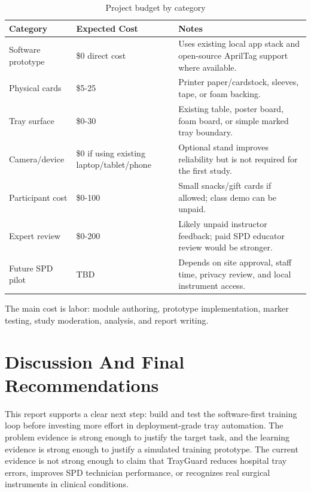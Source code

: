 \documentclass[10pt,a4paper]{article}
\begin{document}
\begin{table}[H]
\centering
\caption{Project budget by category}
\label{tab:project-budget-by-category}
\small\renewcommand{\arraystretch}{1.2}\setlength{\tabcolsep}{4pt}
\begin{tabularx}{\textwidth}{|>{\raggedright\arraybackslash}X|>{\raggedright\arraybackslash}X|>{\raggedright\arraybackslash}X|}
\hline
Category & Expected Cost & Notes \\
\hline
Software prototype & \$0 direct cost & Uses existing local app stack and open-source AprilTag support where available. \\
\hline
Physical cards & \$5-25 & Printer paper/cardstock, sleeves, tape, or foam backing. \\
\hline
Tray surface & \$0-30 & Existing table, poster board, foam board, or simple marked tray boundary. \\
\hline
Camera/device & \$0 if using existing laptop/tablet/phone & Optional stand improves reliability but is not required for the first study. \\
\hline
Participant cost & \$0-100 & Small snacks/gift cards if allowed; class demo can be unpaid. \\
\hline
Expert review & \$0-200 & Likely unpaid instructor feedback; paid SPD educator review would be stronger. \\
\hline
Future SPD pilot & TBD & Depends on site approval, staff time, privacy review, and local instrument access. \\
\hline
\end{tabularx}
\end{table}
The main cost is labor: module authoring, prototype implementation, marker
testing, study moderation, analysis, and report writing.






\section{Discussion And Final Recommendations}
\label{sec:discussion-and-final-recommendations}

This report supports a clear next step: build and test the software-first training
loop before investing more effort in deployment-grade tray automation. The
problem evidence is strong enough to justify the target task, and the learning
evidence is strong enough to justify a simulated training prototype. The
current evidence is not strong enough to claim that TrayGuard reduces hospital
tray errors, improves SPD technician performance, or recognizes real surgical
instruments in clinical conditions.
\end{document}
